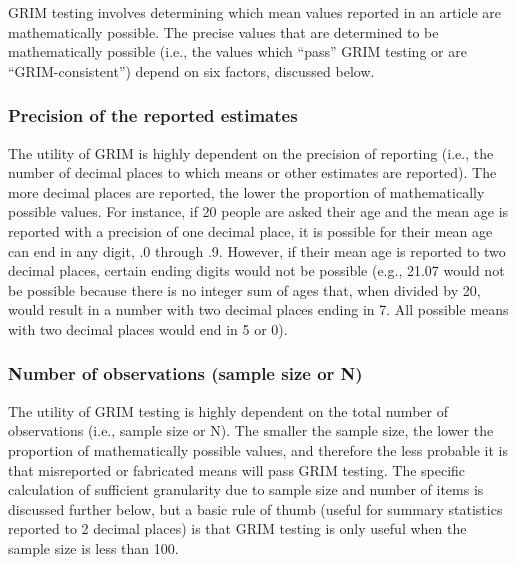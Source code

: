 \documentclass[letterpaper, 12pt]{article}
\begin{document}

GRIM testing involves determining which mean values reported in an article are mathematically possible. The precise values that are determined to be mathematically possible (i.e., the values which ``pass'' GRIM testing or are ``GRIM-consistent'') depend on six factors, discussed below.

\subsubsection*{Precision of the reported estimates}

The utility of GRIM is highly dependent on the precision of reporting (i.e., the number of decimal places to which means or other estimates are reported). The more decimal places are reported, the lower the proportion of mathematically possible values. For instance, if 20 people are asked their age and the mean age is reported with a precision of one decimal place, it is possible for their mean age can end in any digit, .0 through .9. However, if their mean age is reported to two decimal places, certain ending digits would not be possible (e.g., 21.07 would not be possible because there is no integer sum of ages that, when divided by 20, would result in a number with two decimal places ending in 7. All possible means with two decimal places would end in 5 or 0).

\subsubsection*{Number of observations (sample size or N)}

The utility of GRIM testing is highly dependent on the total number of observations (i.e., sample size or N). The smaller the sample size, the lower the proportion of mathematically possible values, and therefore the less probable it is that misreported or fabricated means will pass GRIM testing. The specific calculation of sufficient granularity due to sample size and number of items is discussed further below, but a basic rule of thumb (useful for summary statistics reported to 2 decimal places) is that GRIM testing is only useful when the sample size is less than 100. 
\end{document}
